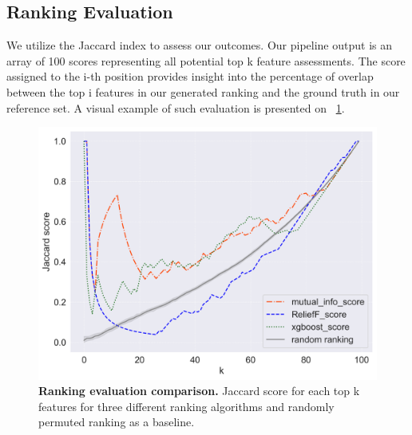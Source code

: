 \documentclass[fleqn,moreauthors,10pt]{ds_report}
\begin{document}

\subsection*{Ranking Evaluation}
We utilize the Jaccard index to assess our outcomes. Our pipeline output is an array of 100 scores representing all potential top k feature assessments. The score assigned to the i-th position provides insight into the percentage of overlap between the top i features in our generated ranking and the ground truth in our reference set. A visual example of such evaluation is presented on \figurename~\ref{fig:evaluation_comparison}.


\begin{figure}
	\includegraphics[width=\linewidth]{img/report_top_k_scores_first_gen.png}
	\caption{\textbf{Ranking evaluation comparison.} Jaccard score for each top k features for three different ranking algorithms and randomly permuted ranking as a baseline.}
	\label{fig:evaluation_comparison}
\end{figure}


\end{document}
